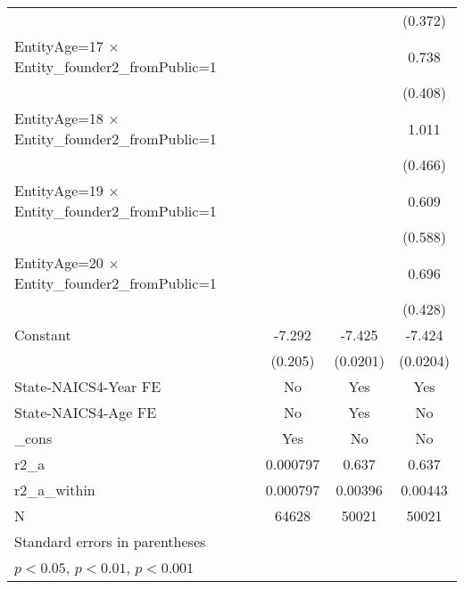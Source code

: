 {\begin{tabular}{l*{3}{c}}
                    &                     &                     &     (0.372)         \\
[1em]
EntityAge=17 $\times$ Entity\_founder2\_fromPublic=1&                     &                     &       0.738         \\
                    &                     &                     &     (0.408)         \\
[1em]
EntityAge=18 $\times$ Entity\_founder2\_fromPublic=1&                     &                     &       1.011\sym{*}  \\
                    &                     &                     &     (0.466)         \\
[1em]
EntityAge=19 $\times$ Entity\_founder2\_fromPublic=1&                     &                     &       0.609         \\
                    &                     &                     &     (0.588)         \\
[1em]
EntityAge=20 $\times$ Entity\_founder2\_fromPublic=1&                     &                     &       0.696         \\
                    &                     &                     &     (0.428)         \\
[1em]
Constant            &      -7.292\sym{***}&      -7.425\sym{***}&      -7.424\sym{***}\\
                    &     (0.205)         &    (0.0201)         &    (0.0204)         \\
[1em]
State-NAICS4-Year FE&          No         &         Yes         &         Yes         \\
[1em]
State-NAICS4-Age FE &          No         &         Yes         &          No         \\
[1em]
\_cons              &         Yes         &          No         &          No         \\
\hline
r2\_a                &    0.000797         &       0.637         &       0.637         \\
r2\_a\_within         &    0.000797         &     0.00396         &     0.00443         \\
N                   &       64628         &       50021         &       50021         \\
\hline\hline
\multicolumn{4}{l}{\footnotesize Standard errors in parentheses}\\
\multicolumn{4}{l}{\footnotesize \sym{*} \(p<0.05\), \sym{**} \(p<0.01\), \sym{***} \(p<0.001\)}\\
\end{tabular}
}
